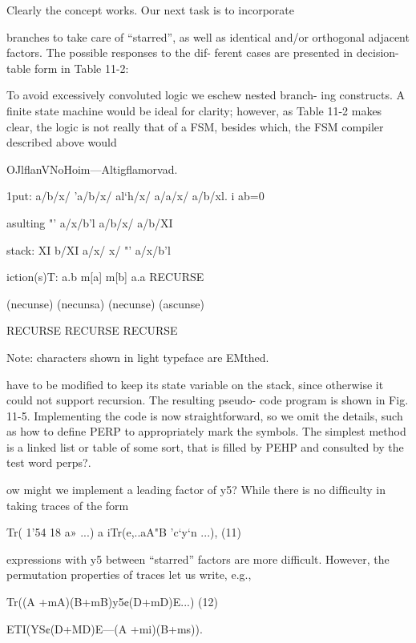 Clearly the concept works. Our next task is to incorporate

branches to take care of “starred”, as well as identical and/or
orthogonal adjacent factors. The possible responses to the dif-
ferent cases are presented in decision-table form in Table 11-2:

To avoid excessively convoluted logic we eschew nested branch-
ing constructs. A ﬁnite state machine would be ideal for clarity;
however, as Table 11-2 makes clear, the logic is not really that of
a FSM, besides which, the FSM compiler described above would

OJlﬂanVNoHoim—Altigﬂamorvad.

 

 

1put: a/b/x/ 'a/b/x/ al‘h/x/ a/a/x/ a/b/xl. i
ab=0

asulting "' a/x/b'l a/b/x/ a/b/XI

stack: XI b/XI a/x/ x/ "' a/x/b’l

iction(s)T: a.b m[a] m[b] a.a RECURSE

 

(necunse) (necunsa) (necunse) (ascunse)

RECURSE RECURSE RECURSE

 

Note: characters shown in light typeface are EMthed.

 

have to be modiﬁed to keep its state variable on the stack, since
otherwise it could not support recursion. The resulting pseudo-
code program is shown in Fig. 11-5. Implementing the code is now
straightforward, so we omit the details, such as how to deﬁne
PERP to appropriately mark the symbols. The simplest method
is a linked list or table of some sort, that is ﬁlled by PEHP and
consulted by the test word perps?.

ow might we implement a leading factor of y5? While there
is no difﬁculty in taking traces of the form

Tr( 1'54 18 a» ...) a iTr(e,..aA"B ’c‘y‘n ...), (11)

expressions with y5 between “starred” factors are more difficult.
However, the permutation properties of traces let us write, e.g.,

Tr((A +mA)(B+mB)y5¢(D+mD)E...)
(12)

ETI(YS¢(D+MD)E---(A +mi)(B+ms)).

 

 

 

